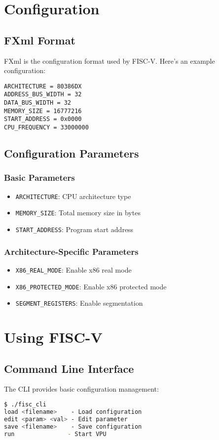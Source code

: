 \documentclass[a4paper,11pt]{book}
\begin{document}
\chapter{Configuration}
\section{FXml Format}
FXml is the configuration format used by FISC-V. Here's an example configuration:

\begin{lstlisting}[style=fxmlstyle]
ARCHITECTURE = 80386DX
ADDRESS_BUS_WIDTH = 32
DATA_BUS_WIDTH = 32
MEMORY_SIZE = 16777216
START_ADDRESS = 0x0000
CPU_FREQUENCY = 33000000
\end{lstlisting}

\section{Configuration Parameters}
\subsection{Basic Parameters}
\begin{itemize}
    \item \texttt{ARCHITECTURE}: CPU architecture type
    \item \texttt{MEMORY\_SIZE}: Total memory size in bytes
    \item \texttt{START\_ADDRESS}: Program start address
\end{itemize}

\subsection{Architecture-Specific Parameters}
\begin{itemize}
    \item \texttt{X86\_REAL\_MODE}: Enable x86 real mode
    \item \texttt{X86\_PROTECTED\_MODE}: Enable x86 protected mode
    \item \texttt{SEGMENT\_REGISTERS}: Enable segmentation
\end{itemize}

\chapter{Using FISC-V}
\section{Command Line Interface}
The CLI provides basic configuration management:
\begin{lstlisting}[language=bash]
$ ./fisc_cli
load <filename>    - Load configuration
edit <param> <val> - Edit parameter
save <filename>    - Save configuration
run               - Start VPU
\end{lstlisting}
\end{document}
